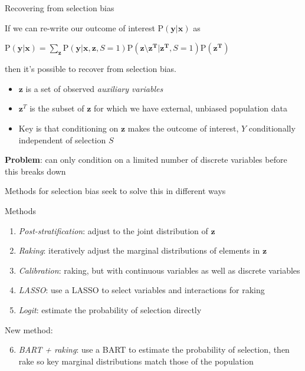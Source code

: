 \documentclass[
  ignorenonframetext,
]{beamer}
\providecommand{\tightlist}{%
  \setlength{\itemsep}{0pt}\setlength{\parskip}{0pt}}
\begin{document}
\begin{frame}{Recovering from selection bias}
\protect\hypertarget{recovering-from-selection-bias}{}

If we can re-write our outcome of interest
\(\text{P}(\mathbf{y}|\mathbf{x})\) as

\(\text{P}(\mathbf{y}|\mathbf{x}) = \sum_\mathbf{z} \text{P}(\mathbf{y}|\mathbf{x}, \mathbf{z}, S=1)\text{P}(\mathbf{z}\setminus\mathbf{z^T}|\mathbf{z^T}, S = 1)\text{P}(\mathbf{z^T})\)

then it's possible to recover from selection bias.

\begin{itemize}
\tightlist
\item
  \(\mathbf{z}\) is a set of observed \emph{auxiliary variables}
\item
  \(\mathbf{z}^T\) is the subset of \(\mathbf{z}\) for which we have
  external, unbiased population data
\item
  Key is that conditioning on \(\mathbf{z}\) makes the outcome of
  interest, \(Y\) conditionally independent of selection \(S\)
\end{itemize}

\textbf{Problem}: can only condition on a limited number of discrete
variables before this breaks down

Methods for selection bias seek to solve this in different ways

\end{frame}

\begin{frame}{Methods}
\protect\hypertarget{methods}{}

\begin{enumerate}
\tightlist
\item
  \emph{Post-stratification}: adjust to the joint distribution of
  \(\mathbf{z}\)
\item
  \emph{Raking}: iteratively adjust the marginal distributions of
  elements in \(\mathbf{z}\)
\item
  \emph{Calibration}: raking, but with continuous variables as well as
  discrete variables
\item
  \emph{LASSO}: use a LASSO to select variables and interactions for
  raking
\item
  \emph{Logit}: estimate the probability of selection directly
\end{enumerate}

New method:

\begin{enumerate}
\setcounter{enumi}{5}
\tightlist
\item
  \emph{BART + raking}: use a BART to estimate the probability of
  selection, then rake so key marginal distributions match those of the
  population
\end{enumerate}

\end{frame}
\end{document}

